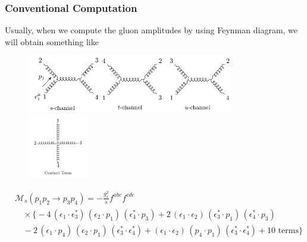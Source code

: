 \documentclass{beamer}
\begin{document}
\begin{frame}
\frametitle{Conventional Computation}

    Usually, when we compute the gluon amplitudes by using Feynman diagram, we will obtain something like 
\begin{figure}
  \centering
  \includegraphics[height=2.5cm]{4ptt2.pdf} \hfill
  \includegraphics[height=2.8cm]{4ptt2_1.pdf}
\end{figure}


\vspace{-2em}

\begin{flushleft}
$
\begin{aligned}
&\mathcal{M}_s(p_1 p_2 \to p_3 p_4) = - \frac{g_s^2}{s} f^{abe} f^{cde} \\
&\quad \times \Big\{ 
-4\, (\epsilon_1 \cdot \epsilon_3^*) \, (\epsilon_2 \cdot p_1) \, (\epsilon_4^* \cdot p_3) 
+ 2\, (\epsilon_1 \cdot \epsilon_2) \, (\epsilon_3^* \cdot p_1) \, (\epsilon_4^* \cdot p_3) \\
& \quad - 2\, (\epsilon_1 \cdot p_4) \, (\epsilon_2 \cdot p_1) \, (\epsilon_3^* \cdot \epsilon_4^*)
+ (\epsilon_1 \cdot \epsilon_2) \, (p_4 \cdot p_1) \, (\epsilon_3^* \cdot \epsilon_4^*)  + \text{10 terms}\big\}
\end{aligned}
$
\end{flushleft}

\end{frame}
\end{document}
